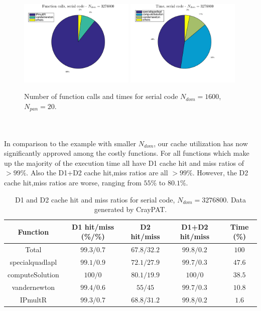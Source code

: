\documentclass[a4paper,10pt]{article}
\begin{document}
\begin{figure}[ht]
    \begin{center}
        \includegraphics[width=0.49\textwidth]{Graphics/craypat_serial_batch10_calls_pie.png}
        \includegraphics[width=0.49\textwidth]{Graphics/craypat_serial_batch10_time_pie.png}
    \end{center}
    \caption{Number of function calls and times for serial code $N_{dom} = 1600$, $N_{pan} = 20$.}
    \label{fig:batch10_serial_pie}
\end{figure} \\ \\
In comparison to the example with smaller $N_{dom}$, our cache utilization has now significantly approved among the costly functions. For all functions which make up the majority of the execution time all have D1 cache hit and miss ratios of $>99\%$. Also the D1+D2 cache hit,miss ratios are all $>99\%$. However, the D2 cache hit,miss ratios are worse, ranging from $55\%$ to $80.1\%$. 
\begin{table}[ht]
\begin{center}
    \begin{tabular}{ c | c | c | c | c }
        Function & D1 hit/miss (\%/\%) & D2 hit/miss & D1+D2 hit/miss & Time (\%) \\ \hline
        Total & $99.3/0.7$ & $67.8/32.2$ & $99.8/0.2$ & $100$ \\ 
        specialquadlapl & $99.1/0.9$ & $72.1/27.9$ & $99.7/0.3$ & $47.6$ \\
        computeSolution & $100/0$ & $80.1/19.9$ & $100/0$ & $38.5$ \\
        vandernewton & $99.4/0.6$ & $55/45$ & $99.7/0.3$ & $10.8$ \\
        IPmultR & $99.3/0.7$ & $68.8/31.2$ & $99.8/0.2$ & $1.6$
    \end{tabular}
    \caption{D1 and D2 cache hit and miss ratios for serial code, $N_{dom} = 3276800$. Data generated by CrayPAT.}
    \label{tab:batch10_serial_caches}
\end{center}
\end{table}  
\end{document}
